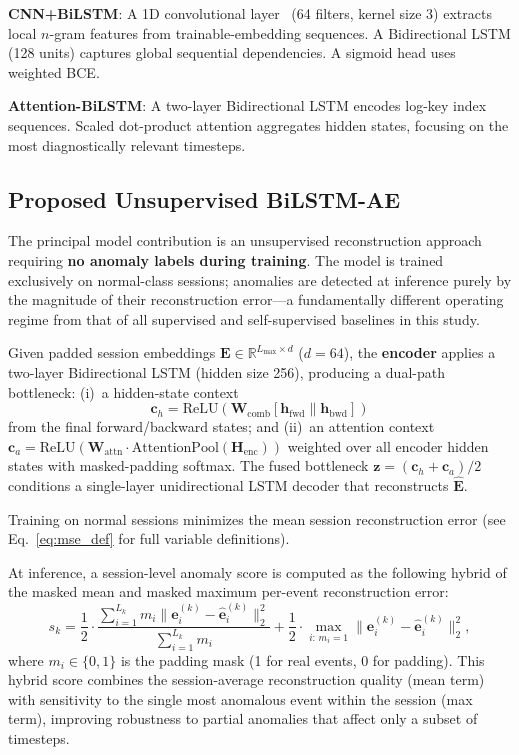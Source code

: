 \documentclass{elektr}
\begin{document}
\textbf{CNN+BiLSTM}: A 1D convolutional layer~\cite{ref11} (64 filters, kernel size 3) extracts
local $n$-gram features from trainable-embedding sequences. A Bidirectional LSTM (128 units)
captures global sequential dependencies. A sigmoid head uses weighted BCE.

\textbf{Attention-BiLSTM}: A two-layer Bidirectional LSTM encodes log-key index
sequences. Scaled dot-product attention aggregates hidden states, focusing on the
most diagnostically relevant timesteps.

\subsection{Proposed Unsupervised BiLSTM-AE}

The principal model contribution is an unsupervised reconstruction approach
requiring \textbf{no anomaly labels during training}. The model is trained
exclusively on normal-class sessions; anomalies are detected at inference purely
by the magnitude of their reconstruction error---a fundamentally different
operating regime from that of all supervised and self-supervised baselines in this study.

Given padded session embeddings $\mathbf{E}\in\mathbb{R}^{L_{\max}\times d}$ ($d{=}64$),
the \textbf{encoder} applies a two-layer Bidirectional LSTM (hidden size 256), producing
a dual-path bottleneck: (i)~a hidden-state context
\begin{equation*}
  \mathbf{c}_h = \mathrm{ReLU}(\mathbf{W}_{\mathrm{comb}}[\mathbf{h}_{\mathrm{fwd}} \| \mathbf{h}_{\mathrm{bwd}}])
\end{equation*}
from the final forward/backward states; and (ii)~an attention context
$\mathbf{c}_a = \mathrm{ReLU}(\mathbf{W}_{\mathrm{attn}}\cdot\mathrm{AttentionPool}(\mathbf{H}_{\mathrm{enc}}))$
weighted over all encoder hidden states with masked-padding softmax.
The fused bottleneck $\mathbf{z} = (\mathbf{c}_h + \mathbf{c}_a)/2$ conditions
a single-layer unidirectional LSTM decoder that reconstructs $\hat{\mathbf{E}}$.

Training on normal sessions minimizes the mean session reconstruction error (see Eq.~\ref{eq:mse_def}
for full variable definitions).

At inference, a session-level anomaly score is computed as the following hybrid
of the masked mean and masked maximum per-event reconstruction error:
\begin{equation}
s_k = \frac{1}{2}\cdot\frac{\sum_{i=1}^{L_k} m_i \|\mathbf{e}_i^{(k)}-\hat{\mathbf{e}}_i^{(k)}\|^2_2}{\sum_{i=1}^{L_k} m_i}
      + \frac{1}{2}\cdot\max_{i:\,m_i=1}\|\mathbf{e}_i^{(k)}-\hat{\mathbf{e}}_i^{(k)}\|^2_2,
\label{eq:hybrid_score}
\end{equation}
where $m_i\in\{0,1\}$ is the padding mask (1 for real events, 0 for padding).
This hybrid score combines the session-average reconstruction quality (mean term) with
sensitivity to the single most anomalous event within the session (max term),
improving robustness to partial anomalies that affect only a subset of timesteps.
\end{document}
